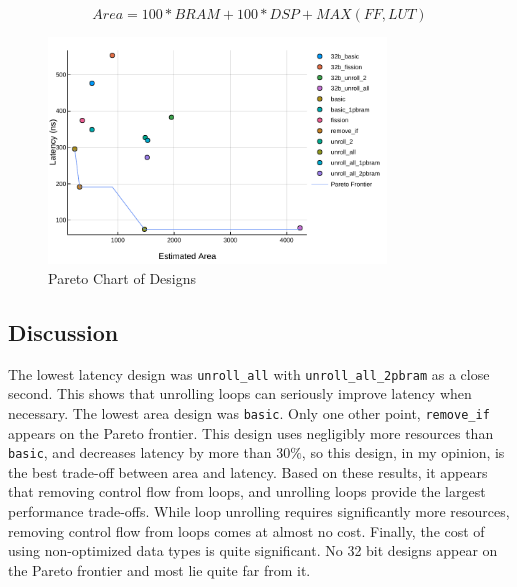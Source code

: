 \documentclass[12pt, letter]{article}
\begin{document}
\begin{equation}
	Area = 100*BRAM+100*DSP+MAX(FF, LUT)
	\label{eq:area}
\end{equation}

\begin{figure}[h]
	\centering
	\includegraphics[width=0.8\textwidth]{pareto.pdf}
	\caption{Pareto Chart of Designs}
	\label{fig:pareto}
\end{figure}

\subsection*{Discussion}
The lowest latency design was \texttt{unroll\_all} with \texttt{unroll\_all\_2pbram} as a close second. This shows that unrolling loops can seriously improve latency when necessary. The lowest area design was \texttt{basic}. Only one other point, \texttt{remove\_if} appears on the Pareto frontier. This design uses negligibly more resources than \texttt{basic}, and decreases latency by more than $30\%$, so this design, in my opinion, is the best trade-off between area and latency. Based on these results, it appears that removing control flow from loops, and unrolling loops provide the largest performance trade-offs. While loop unrolling requires significantly more resources, removing control flow from loops comes at almost no cost. Finally, the cost of using non-optimized data types is quite significant. No 32 bit designs appear on the Pareto frontier and most lie quite far from it.
\end{document}
